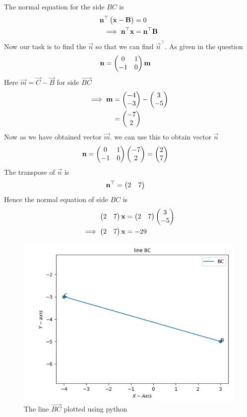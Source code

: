        The normal equation for the side $BC$ is
\begin{align}
\mathbf{n}^{\top}\begin{pmatrix}\mathbf{x}-\mathbf{B}\end{pmatrix}&=0\\
\implies
\mathbf{n}^{\top}\mathbf{x}&=\mathbf{n}^{\top}\mathbf{B}
\end{align}
Now our task is to find the $\vec{n}$ so that we can find $\vec{n}^{\top}$.
As given in the question 
\begin{align}
  \mathbf{n} &= \begin{pmatrix}0 & 1\\
  -1 & 0\end{pmatrix}\mathbf{m}
\end{align}
Here $\vec{m} = \vec{C}- \vec{B}$ for side $\vec{BC}$
\begin{align}
\implies
\mathbf{m}&=\begin{pmatrix}-4\\-3\end{pmatrix} - \begin{pmatrix}3\\-5\end{pmatrix}\\
&=\begin{pmatrix}-7\\2\end{pmatrix}
\end{align}
Now as we have obtained vector $\vec{m}$.
we can use this to obtain vector $\vec{n}$
\begin{align}
\mathbf{n} &= \begin{pmatrix}0 & 1\\
  -1 & 0\end{pmatrix}\begin{pmatrix}-7\\2\end{pmatrix}
 = \begin{pmatrix}2\\7\end{pmatrix}
\end{align}
The transpose of $\vec{n}$ is
\begin{align}
  \mathbf{n}^{\top}&=\begin{pmatrix}2 & 7\end{pmatrix}
\end{align}
Hence the normal equation of side $BC$ is 
\begin{align}
    \begin{pmatrix}2 & 7\end{pmatrix}\mathbf{x}&=\begin{pmatrix}2 & 7\end{pmatrix}\begin{pmatrix}3\\-5\end{pmatrix}\\
    \implies
    \begin{pmatrix}2 & 7\end{pmatrix}\mathbf{x}&=-29
\end{align}
\begin{figure}
\includegraphics [width=\columnwidth] {figs/linebc.png}
\caption{ The line $\vec{BC}$ plotted using python}
\label{fig: linebc}
\end{figure}



